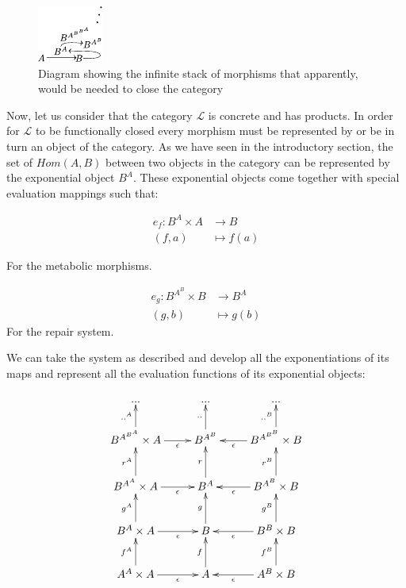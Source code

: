 \documentclass[aps,twocolumn]{revtex4-1}
\begin{document}
\begin{figure}
\noindent\includegraphics[width=0.45\columnwidth]{fig/mrcatinf.pdf}
\caption{Diagram showing the infinite stack of morphisms that apparently, would be needed to close the category}
\label{fig:hom}
\end{figure}

Now, let us consider that the category $\mathcal{L}$ is concrete and has products. In order for  $\mathcal{L}$  to be functionally closed every morphism must be represented by or be in turn an object of the category. As we have seen in the introductory section, the set of $Hom(A,B)$ between two objects in the category can be represented by the exponential object $B^A$. These exponential objects come together with special evaluation mappings such that:

\begin{align*}
e_f : B^A \times A &\longrightarrow B\\
(f,a) & \longmapsto f(a)
\end{align*}

For the metabolic morphisms.	
	
\begin{align*}
			e_g: B^{A^B} \times B &\longrightarrow B^A\\
	    			            (g,b) & \longmapsto    g(b)
			\end{align*}		
For the repair system.

 We can take the system as described and develop all the exponentiations of its maps and represent all the evaluation functions of its exponential objects:		

$$
			\xymatrix{
			 ... & ... & ... \\
			  B^{A^{B^A}} \times A \ar[r]_-{\epsilon} \ar[u]^-{..^A} & B^{A^B} \ar[u]^-{..} & B^{A^{B^B}} \times B\ar[l]^-{\epsilon}\ar[u]^-{..^B} \\
			 B^{A^A} \times A \ar[r]_-{\epsilon} \ar[u]^-{r^A} & B^A \ar[u]^-{r} & B^{A^B} \times B\ar[l]^-{\epsilon}\ar[u]^-{r^B} \\
			B^A \times A \ar[r]_-{\epsilon} \ar[u]^-{g^A} & B \ar[u]^-{g} & B^B \times B\ar[l]^-{\epsilon}\ar[u]^-{g^B} \\
			A^A \times A \ar[r]_-{\epsilon} \ar[u]^-{f^A} & 
			A\ar[u]^-{f} & A^B\times B\ar[l]^-{\epsilon}\ar[u]^-{f^B} }
			$$
\end{document}
